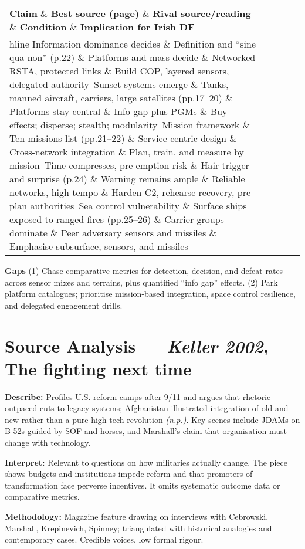  
\begin{tabular}{p{3.2cm}p{4.2cm}p{3.6cm}p{3.2cm}p{4.2cm}}
	\textbf{Claim} \& \textbf{Best source (page)} \& \textbf{Rival source/reading} \& \textbf{Condition} \& \textbf{Implication for Irish DF}\\hline
	Information dominance decides \& Definition and “sine qua non” (p.22) \& Platforms and mass decide \& Networked RSTA, protected links \& Build COP, layered sensors, delegated authority\
	Sunset systems emerge \& Tanks, manned aircraft, carriers, large satellites (pp.17–20) \& Platforms stay central \& Info gap plus PGMs \& Buy effects; disperse; stealth; modularity\
	Mission framework \& Ten missions list (pp.21–22) \& Service-centric design \& Cross-network integration \& Plan, train, and measure by mission\
	Time compresses, pre-emption risk \& Hair-trigger and surprise (p.24) \& Warning remains ample \& Reliable networks, high tempo \& Harden C2, rehearse recovery, pre-plan authorities\
	Sea control vulnerability \& Surface ships exposed to ranged fires (pp.25–26) \& Carrier groups dominate \& Peer adversary sensors and missiles \& Emphasise subsurface, sensors, and missiles\
\end{tabular}


\textbf{Gaps}
(1) Chase comparative metrics for detection, decision, and defeat rates across sensor mixes and terrains, plus quantified “info gap” effects.
(2) Park platform catalogues; prioritise mission-based integration, space control resilience, and delegated engagement drills.

\parencite{KELLER_2002}

\section*{Source Analysis — \textit{Keller 2002}, The fighting next time}
\textbf{Describe:} Profiles U.S. reform camps after 9/11 and argues that rhetoric outpaced cuts to legacy systems; Afghanistan illustrated integration of old and new rather than a pure high-tech revolution \emph{(n.p.)}. Key scenes include JDAMs on B-52s guided by SOF and horses, and Marshall’s claim that organisation must change with technology.

\textbf{Interpret:} Relevant to questions on how militaries actually change. The piece shows budgets and institutions impede reform and that promoters of transformation face perverse incentives. It omits systematic outcome data or comparative metrics.

\textbf{Methodology:} Magazine feature drawing on interviews with Cebrowski, Marshall, Krepinevich, Spinney; triangulated with historical analogies and contemporary cases. Credible voices, low formal rigour.

